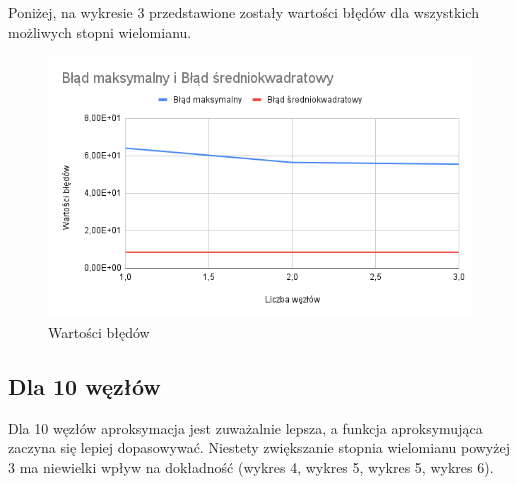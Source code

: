 \documentclass{article}
\begin{document}
\noindent
Poniżej, na wykresie 3 przedstawione zostały wartości błędów dla wszystkich możliwych stopni wielomianu.

\begin{figure}[H]
  \centering
  \begin{minipage}[b]{0.4\textwidth}
    \includegraphics[width=\textwidth]{img03.png}
    \caption{Wartości błędów}
  \end{minipage}
\end{figure}

\newpage

\subsection{Dla 10 węzłów}

\noindent

Dla 10 węzłów aproksymacja jest zuważalnie lepsza, a funkcja aproksymująca zaczyna się lepiej dopasowywać. Niestety zwiększanie stopnia wielomianu powyżej 3 ma niewielki wpływ na dokładność (wykres 4, wykres 5, wykres 5, wykres 6).
\end{document}
